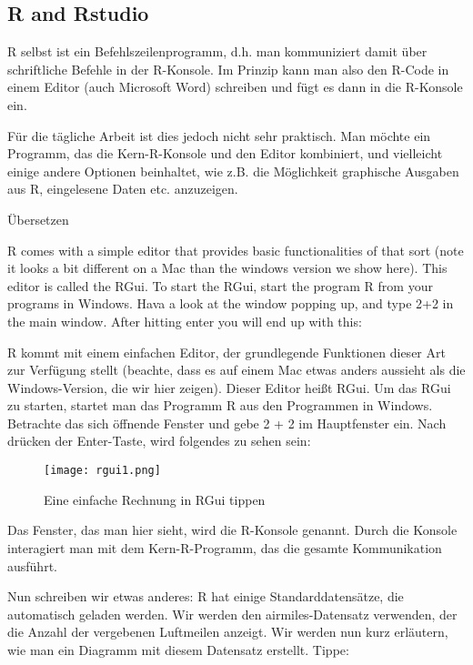 \documentclass[a4paper,twoside]{tufte-book}\usepackage[]{graphicx}\usepackage[]{color}
\begin{document}
\begin{appendices}

\chapter{R and Rstudio}

R selbst ist ein Befehlszeilenprogramm, d.h. man kommuniziert damit über schriftliche Befehle in der R-Konsole. Im Prinzip kann man also den R-Code in einem Editor (auch Microsoft Word) schreiben und fügt es dann in die R-Konsole ein.

Für die tägliche Arbeit ist dies jedoch nicht sehr praktisch. Man möchte ein Programm, das die Kern-R-Konsole und den Editor kombiniert, und vielleicht einige andere Optionen beinhaltet, wie z.B. die Möglichkeit graphische Ausgaben aus R, eingelesene Daten etc. anzuzeigen. 

Übersetzen

R comes with a simple editor that provides basic functionalities of that sort (note it looks a bit different on a Mac than the windows version we show here). This editor is called the RGui. To start the RGui, start the program R from your programs in Windows. Hava a look at the window popping up, and type 2+2 in the main window. After hitting enter you will end up with this:

R kommt mit einem einfachen Editor, der grundlegende Funktionen dieser Art zur Verfügung stellt (beachte, dass es auf einem Mac etwas anders aussieht als die Windows-Version, die wir hier zeigen). Dieser Editor heißt RGui. Um das RGui zu starten, startet man das Programm R aus den Programmen in Windows. Betrachte das sich öffnende Fenster und gebe 2 + 2 im Hauptfenster ein. Nach drücken der Enter-Taste, wird folgendes zu sehen sein:

\begin{figure}[]
\begin{center}
\texttt{[image: rgui1.png]}
\caption{Eine einfache Rechnung in RGui tippen}
\label{fig: Rgui1}
\end{center}
\end{figure}


Das Fenster, das man hier sieht, wird die R-Konsole genannt. Durch die Konsole interagiert man mit dem Kern-R-Programm, das die gesamte Kommunikation ausführt.

Nun schreiben wir etwas anderes: R hat einige Standarddatensätze, die automatisch geladen werden. Wir werden den airmiles-Datensatz verwenden, der die Anzahl der vergebenen Luftmeilen anzeigt. Wir werden nun kurz erläutern, wie man ein Diagramm mit diesem Datensatz erstellt. Tippe:


\end{appendices}
\end{document}
